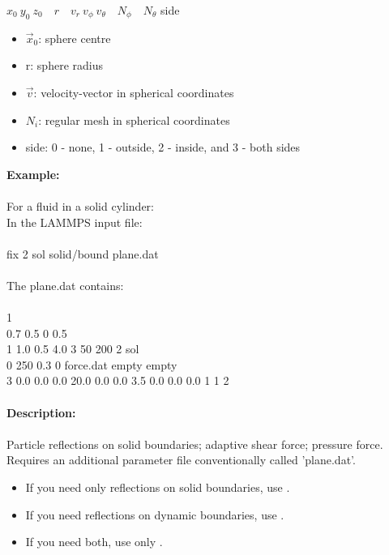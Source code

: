 \documentclass[a4paper,10pt]{scrreprt}
\begin{document}
\begin{enumerate}
\begin{enumerate}
		$ x_0\ y_0\ z_0\quad r\quad v_r\ v_{\phi}\ v_{\theta}\quad N_{\phi}\quad N_{\theta}$ { side}
		\begin{itemize}
	   	\item $\vec{x}_0$: sphere centre
	   	\item r: sphere radius
	   	\item $\vec{v}$: velocity-vector in spherical coordinates
	   	\item $ N_i$: regular mesh in spherical coordinates
	   	\item side: 0 - none, 1 - outside, 2 - inside, and 3 - both sides
		\end{itemize}
	\end{enumerate}

\end{enumerate}

\textbf{Example:}\\ \\
For a fluid in a solid cylinder:\\
In the LAMMPS input file:\\ \\
fix	2 sol solid/bound plane.dat\\ \\
The plane.dat contains:\\ \\
1\\
0.7 0.5 0 0.5\\
1 1.0 0.5 4.0 3 50 200 2 sol\\
0 250 0.3 0 force.dat empty empty\\
3 0.0 0.0 0.0 20.0 0.0 0.0 3.5 0.0 0.0 0.0 1 1 2\\ \\

\textbf{Description:}\\ \\
Particle reflections on solid boundaries; adaptive shear force; pressure force.\\Requires an additional parameter file conventionally called 'plane.dat'.
\begin{itemize}
\item If you need only reflections on solid boundaries, use .
\item If you need reflections on dynamic boundaries, use .
\item If you need both, use only .
\end{itemize}
\end{document}
